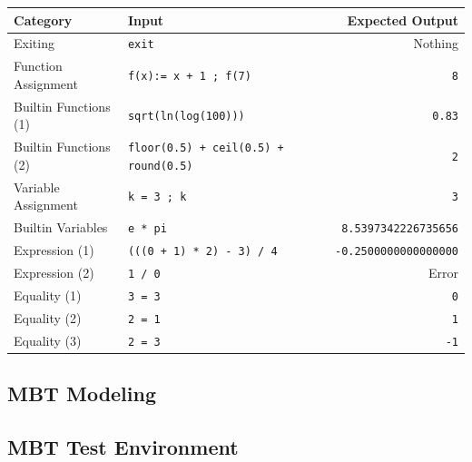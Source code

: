 \documentclass[11pt,a4paper]{article}
\begin{document}
\begin{center}
	\begin{tabular}{llr}
		Category & Input & Expected Output\\
		\hline
		Exiting & \texttt{exit} & Nothing\\
		Function Assignment & \texttt{f(x):= x + 1 ; f(7)} & \texttt{8}\\
		Builtin Functions (1) & \texttt{sqrt(ln(log(100)))} & \texttt{0.83}\\
		Builtin Functions (2) & \texttt{floor(0.5) + ceil(0.5) + round(0.5)} & \texttt{2}\\
		Variable Assignment & \texttt{k = 3 ; k} & \texttt{3}\\
		Builtin Variables & \texttt{e * pi} & \texttt{8.5397342226735656}\\
		Expression (1) & \texttt{(((0 + 1) * 2) - 3) / 4} & \texttt{-0.2500000000000000}\\
		Expression (2) & \texttt{1 / 0} & Error\\
		Equality (1) & \texttt{3 = 3} & \texttt{0}\\
		Equality (2) & \texttt{2 = 1} & \texttt{1}\\
		Equality (3) & \texttt{2 = 3} & \texttt{-1}\\
	\end{tabular}
\end{center}



\subsection{MBT Modeling}

\subsection{MBT Test Environment}
\end{document}
